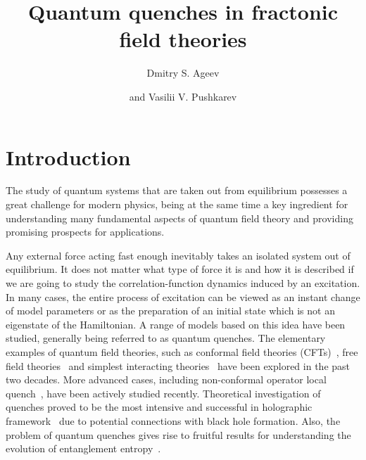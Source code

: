 \documentclass[a4paper,12pt]{article}
\title{Quantum quenches in fractonic field theories}
\author{Dmitry S. Ageev}
\author{and Vasilii V. Pushkarev}
\affiliation{Steklov Mathematical Institute, Russian Academy of Sciences,\\
Gubkin str. 8, 119991 Moscow, Russian Federation}
\begin{document}
 
\maketitle
\flushbottom

\section{Introduction}

The study of quantum systems that are taken out from equilibrium possesses a great challenge for modern physics, being at the same time a key ingredient for understanding many fundamental aspects of quantum field theory and providing promising prospects for applications.

Any external force acting fast enough inevitably takes an isolated system out of equilibrium. It does not matter what type of force it is and how it is described if we are going to study the correlation-function dynamics induced by an excitation. In many cases, the entire process of excitation can be viewed as an instant change of model parameters or as the preparation of an initial state which is not an eigenstate of the Hamiltonian. A range of models based on this idea have been studied, generally being referred to as quantum quenches. The elementary examples of quantum field theories, such as conformal field theories (CFTs)~\cite{Calabrese:2006rx, Calabrese:2007rg, Das:2014hqa, Calabrese:2016xau}, free field theories~\cite{Sotiriadis2009thermal, Rajabpour:2014osa, Das:2015jka, Das:2016lla} and simplest interacting theories~\cite{Sotiriadis:2010si} have been explored in the past two decades. More advanced cases, including non-conformal operator local quench~\cite{He:2019vzf, Ageev:2022kpm}, have been actively studied recently. Theoretical investigation of quenches proved to be the most intensive and successful in holographic framework~\cite{Danielsson:1999fa, Balasubramanian:2010ce, Balasubramanian:2011ur, Buchel:2013gba, Asplund:2014coa, Ageev:2017oku, Ageev:2017wet} due to potential connections with black hole formation. Also, the problem of quantum quenches gives rise to fruitful results for understanding the evolution of entanglement entropy~\cite{Calabrese:2005in, Nozaki:2014hna, He:2014mwa, Caputa:2014eta, Cotler:2016acd, Mozaffar:2021nex}.
\end{document}
